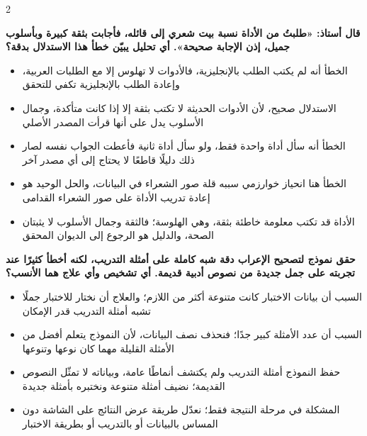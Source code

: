 \documentclass[10pt,a4paper]{article}
\begin{document}
\begin{multicols}{2}
\noindent\begin{minipage}{\linewidth}
\hangindent=0.7cm\textbf{قال أستاذ: «طلبتُ من الأداة نسبة بيت شعري إلى قائله، فأجابت بثقة كبيرة وبأسلوب جميل، إذن الإجابة صحيحة». أي تحليل يبيّن خطأ هذا الاستدلال بدقة؟}
\begin{itemize}[leftmargin=0.95cm, labelsep=4pt, itemsep=1pt, topsep=3pt, parsep=0pt]
  \item[\textbf{أ)}] الخطأ أنه لم يكتب الطلب بالإنجليزية، فالأدوات لا تهلوس إلا مع الطلبات العربية، وإعادة الطلب بالإنجليزية تكفي للتحقق
  \item[\textbf{ب)}] الاستدلال صحيح، لأن الأدوات الحديثة لا تكتب بثقة إلا إذا كانت متأكدة، وجمال الأسلوب يدل على أنها قرأت المصدر الأصلي
  \item[\textbf{ج)}] الخطأ أنه سأل أداة واحدة فقط، ولو سأل أداة ثانية فأعطت الجواب نفسه لصار ذلك دليلًا قاطعًا لا يحتاج إلى أي مصدر آخر
  \item[\textbf{د)}] الخطأ هنا انحياز خوارزمي سببه قلة صور الشعراء في البيانات، والحل الوحيد هو إعادة تدريب الأداة على صور الشعراء القدامى
  \item[\textbf{هـ)}] الأداة قد تكتب معلومة خاطئة بثقة، وهي الهلوسة؛ فالثقة وجمال الأسلوب لا يثبتان الصحة، والدليل هو الرجوع إلى الديوان المحقق
\end{itemize}
\end{minipage}\par\vspace{8pt plus 6pt}
\noindent\begin{minipage}{\linewidth}
\hangindent=0.7cm\textbf{حقق نموذج لتصحيح الإعراب دقة شبه كاملة على أمثلة التدريب، لكنه أخطأ كثيرًا عند تجربته على جمل جديدة من نصوص أدبية قديمة. أي تشخيص وأي علاج هما الأنسب؟}
\begin{itemize}[leftmargin=0.95cm, labelsep=4pt, itemsep=1pt, topsep=3pt, parsep=0pt]
  \item[\textbf{أ)}] السبب أن بيانات الاختبار كانت متنوعة أكثر من اللازم؛ والعلاج أن نختار للاختبار جملًا تشبه أمثلة التدريب قدر الإمكان
  \item[\textbf{ب)}] السبب أن عدد الأمثلة كبير جدًا؛ فنحذف نصف البيانات، لأن النموذج يتعلم أفضل من الأمثلة القليلة مهما كان نوعها وتنوعها
  \item[\textbf{ج)}] حفظ النموذج أمثلة التدريب ولم يكتشف أنماطًا عامة، وبياناته لا تمثّل النصوص القديمة؛ نضيف أمثلة متنوعة ونختبره بأمثلة جديدة
  \item[\textbf{د)}] المشكلة في مرحلة النتيجة فقط؛ نعدّل طريقة عرض النتائج على الشاشة دون المساس بالبيانات أو بالتدريب أو بطريقة الاختبار

\end{itemize}
\end{minipage}
\end{multicols}
\end{document}
